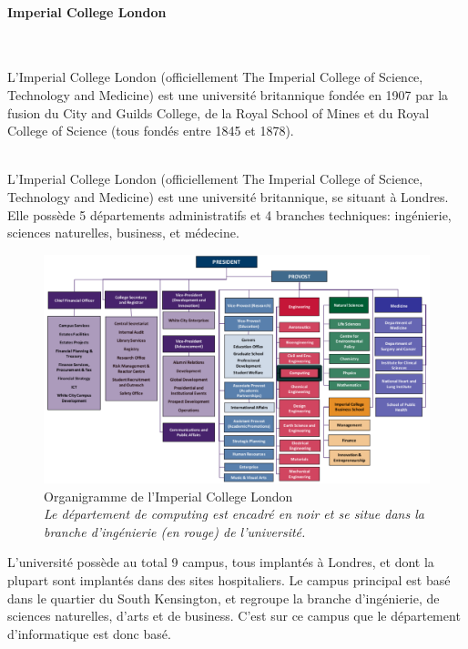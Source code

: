 \documentclass[10pt]{report}
\begin{document}
	\paragraph{Imperial College London}~\par  %
	L’Imperial College London (officiellement The Imperial College of Science, Technology and Medicine) est une université britannique fondée en 1907 par la fusion du City and Guilds College, de la Royal School of Mines et du Royal College of Science (tous fondés entre 1845 et 1878).\\ ~\par 
   	L’Imperial College London (officiellement The Imperial College of Science, Technology and Medicine) est une université britannique, se situant à Londres. Elle possède 5 départements administratifs et 4 branches techniques: ingénierie, sciences naturelles, business, et médecine.	
	\begin{figure}[h!]
		\begin{center}
			\includegraphics[width=18cm]{Reports/figures/College-Organisation.pdf}
		\end{center}
		\caption{Organigramme de l'Imperial College London \\ \textit{Le département de computing est encadré en noir et se situe dans la branche d'ingénierie (en rouge) de l'université.}}
		\label{Organigramme de l'Imperial College London}
	\end{figure}
	

	 L'université possède au total 9 campus, tous implantés à Londres, et dont la plupart sont implantés dans des sites hospitaliers. Le campus principal est basé dans le quartier du South Kensington, et regroupe la branche d'ingénierie, de sciences naturelles, d'arts et de business. C'est sur ce campus que le département d'informatique est donc basé.
	
\end{document}
